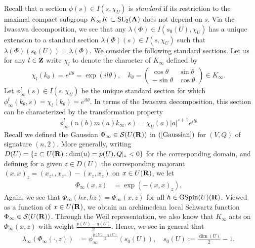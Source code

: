 \documentclass{amsart}
\theoremstyle{definition}
\theoremstyle{definition}
\theoremstyle{definition}
\begin{document}
Recall that a section $\phi(s) \in I(s, \chi_U)$ is {\it{standard}} if its restriction to the maximal compact subgroup $K_{\infty} K \subset \operatorname{SL}_2({\bf{A}})$
does not depend on $s$. Via the Iwasawa decomposition, we see that any $\lambda(\Phi) \in I(s_0(U), \chi_U)$ has a unique extension to a standard 
section $\lambda(\Phi)(s) \in I(s, \chi_U)$ such that $\lambda(\Phi)(s_0(U)) = \lambda(\Phi)$. We consider the following standard sections.
Let us for any $l \in {\bf{Z}}$ write $\chi_l$ to denote the character of $K_{\infty}$ defined by 
\begin{align*} \chi_l(k_{\theta}) = e^{i l \theta} = \exp(i l \theta), 
\quad k_{\theta} = \left( \begin{array}{cc} \cos \theta & \sin \theta \\ - \sin \theta & \cos \theta\end{array} \right) \in K_{\infty}. \end{align*} 
Let $\phi_{\infty}^{l}(s) \in I(s, \chi_U)$ be the unique standard section for which $\phi_{\infty}^l(k_{\theta}, s) = \chi_l(k_{\theta}) = e^{il \theta}$.
In terms of the Iwasawa decomposition, this section can be characterized by the transformation property 
\begin{align*} \phi_{\infty}^l(n(b) m(a) k_{\infty}, s)  =  \chi_{U}(a) \vert a \vert^{s+1} e^{i l \theta}  \end{align*}
Recall we defined the Gaussian $\Phi_{\infty} \in \mathcal{S}(U({\bf{R}}))$ in $(\ref{Gaussian})$ for $(V, Q)$ of signature $(n,2)$. 
More generally, writing $D(U) = \left\lbrace z \subset U({\bf{R}}): \dim(u) = p(U), Q\vert_z <0 \right\rbrace$  
for the corresponding domain, and defining for a given $z \in D(U)$ the 
corresponding majorant $(x, x)_z = (x_{z^{\perp}}, x_{z^{\perp}}) - (x_z, x_z)$ on $x \in U({\bf{R}})$, we let
\begin{align*} \Phi_{\infty}(x, z) &= \exp \left( - (x, x)_z \right). \end{align*}
Again, we see that $\Phi_{\infty}(h x, h z) = \Phi_{\infty}(x, z)$ for all $h \in \operatorname{GSpin}(U)({\bf{R}})$. 
Viewed as a function of $x \in U({\bf{R}})$, we obtain an archimedean local Schwartz function $\Phi_{\infty} \in \mathcal{S}(U({\bf{R}}))$.
Through the Weil representation, we also know that $K_{\infty}$ acts on $\Phi_{\infty}(x, z)$ with weight $\frac{p(U)-q(U)}{2}$. 
Hence, we see in general that  \begin{align*} \lambda_{\infty}(\Phi_{\infty}(\cdot, z)) &= \phi_{\infty}^{\frac{p(U)-q(U)}{2}}(s_0(U)),
\quad s_0(U) := \frac{\dim(U)}{2}-1. \end{align*}
\end{document}
